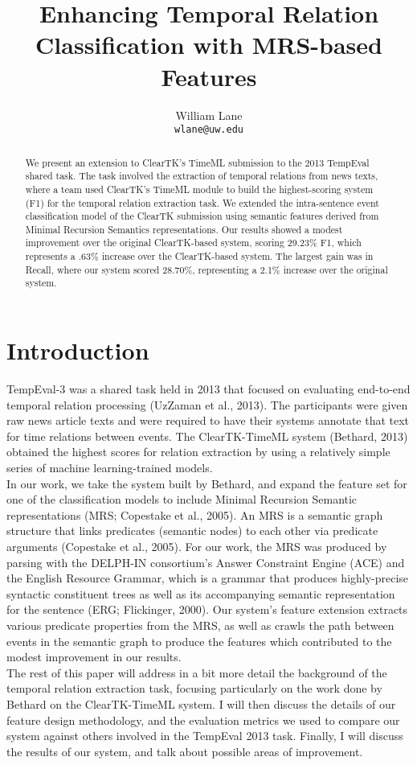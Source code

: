 \documentclass[11pt]{article}
\title{Enhancing Temporal Relation Classification with MRS-based Features}
\author{William Lane \\
  {\tt wlane@uw.edu} \\}
\date{}
\begin{document}
\maketitle
\begin{abstract}
  We present an extension to ClearTK's TimeML submission to the 2013 TempEval shared task. The task involved the extraction of temporal relations from news texts, where a team used ClearTK's TimeML module to build the highest-scoring system (F1) for the temporal relation extraction task. We extended the intra-sentence event classification model of the ClearTK submission using semantic features derived from Minimal Recursion Semantics representations. Our results showed a modest improvement over the original ClearTK-based system, scoring 29.23\% F1, which represents a .63\% increase over the ClearTK-based system. The largest gain was in Recall, where our system scored 28.70\%, representing a 2.1\% increase over the original system.
\end{abstract}

\section{Introduction}
	TempEval-3 was a shared task held in 2013 that focused on evaluating end-to-end temporal relation processing (UzZaman et al., 2013). The participants were given raw news article texts and were required to have their systems annotate that text for time relations between events. The ClearTK-TimeML system (Bethard, 2013) obtained the highest scores for relation extraction by using a relatively simple series of machine learning-trained models. 
	\\\indent In our work, we take the system built by Bethard, and expand the feature set for one of the classification models to include Minimal Recursion Semantic representations (MRS; Copestake et
al., 2005). An MRS is a semantic graph structure that links predicates (semantic nodes) to each other via predicate arguments  (Copestake et al., 2005). For our work, the MRS was produced by parsing with the DELPH-IN consortium's Answer Constraint Engine (ACE) and the English Resource Grammar, which is a grammar that produces highly-precise syntactic constituent trees as well as its accompanying semantic representation for the sentence (ERG; Flickinger, 2000). Our system's feature extension extracts various predicate properties from the MRS, as well as crawls the path between events in the semantic graph to produce the features which contributed to the modest improvement in our results.\\
\indent The rest of this paper will address in a bit more detail the background of the temporal relation extraction task, focusing particularly on the work done by Bethard on the ClearTK-TimeML system. I will then discuss the details of our feature design methodology, and the evaluation metrics we used to compare our system against others involved in the TempEval 2013 task. Finally, I will discuss the results of our system, and talk about possible areas of improvement.
	
\end{document}
